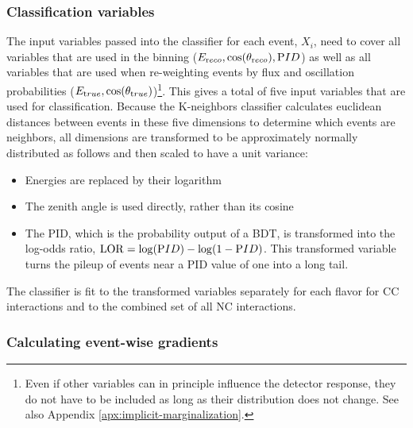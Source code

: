 \subsubsection{Classification variables}
The input variables passed into the classifier for each event, $X_i$, need to cover all variables that are used in the binning ($E_{\rm reco},\cos(\theta_{\rm reco}),{\rm PID}$) as well as all variables that are used when re-weighting events by flux and oscillation probabilities ($E_{\rm true},\cos(\theta_{\rm true})$)\footnote{Even if other variables can in principle influence the detector response, they do not have to be included as long as their distribution does not change. See also Appendix \ref{apx:implicit-marginalization}.}. This gives a total of five input variables that are used for classification. Because the K-neighbors classifier calculates euclidean distances between events in these five dimensions to determine which events are neighbors, all dimensions are transformed to be approximately normally distributed as follows and then scaled to have a unit variance:
\begin{itemize}
    \item Energies are replaced by their logarithm
    \item The zenith angle is used directly, rather than its cosine
    \item The PID, which is the probability output of a BDT, is transformed into the log-odds ratio, $\mathrm{LOR}=\log({\rm PID}) - \log(1-{\rm PID})$. This transformed variable turns the pileup of events near a PID value of one into a long tail.
\end{itemize}
The classifier is fit to the transformed variables separately for each flavor for CC interactions and to the combined set of all NC interactions.

\subsubsection{Calculating event-wise gradients}

